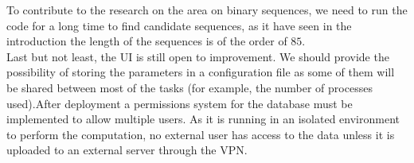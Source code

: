 \documentclass{tfg_domingo}
\begin{document}
To contribute to the research on the area on binary sequences, we need to run the code for a long time to find candidate sequences, as it have seen in the introduction the length of the sequences is of the order of $85$.\\

  Last but not least, the UI is still open to improvement. We should provide the
  possibility of storing the parameters in a configuration file as some of
  them will be shared between most of the tasks (for example, the number of
  processes used).After deployment a  permissions system for the database must be implemented to allow multiple users. As it is  running in an isolated
  environment to perform the computation, no external user has access to the
  data unless it is uploaded to an external server through the VPN.\\

 





\backmatter


\end{document}
